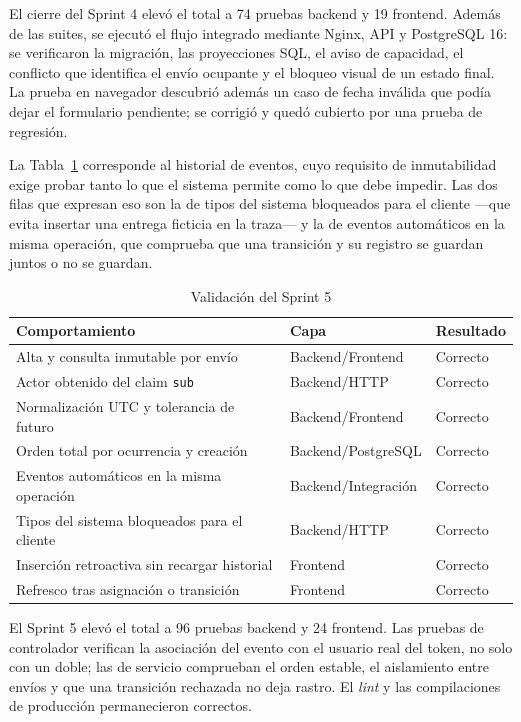 El cierre del Sprint 4 elevó el total a 74 pruebas backend y 19 frontend. Además de las suites, se ejecutó el flujo integrado mediante Nginx, API y PostgreSQL 16: se verificaron la migración, las proyecciones SQL, el aviso de capacidad, el conflicto que identifica el envío ocupante y el bloqueo visual de un estado final. La prueba en navegador descubrió además un caso de fecha inválida que podía dejar el formulario pendiente; se corrigió y quedó cubierto por una prueba de regresión.

La Tabla~\ref{tab:val-s5} corresponde al historial de eventos, cuyo requisito de inmutabilidad exige probar tanto lo que el sistema permite como lo que debe impedir. Las dos filas que expresan eso son la de tipos del sistema bloqueados para el cliente ---que evita insertar una entrega ficticia en la traza--- y la de eventos automáticos en la misma operación, que comprueba que una transición y su registro se guardan juntos o no se guardan.

\begin{table}[htbp]
\centering
\caption{Validación del Sprint 5}
\label{tab:val-s5}
\begin{tabular}{p{6.1cm}p{2.2cm}p{2.3cm}}
\hline Comportamiento & Capa & Resultado \\ \hline
Alta y consulta inmutable por envío & Backend/\allowbreak Frontend & Correcto \\
Actor obtenido del claim \texttt{sub} & Backend/\allowbreak HTTP & Correcto \\
Normalización UTC y tolerancia de futuro & Backend/\allowbreak Frontend & Correcto \\
Orden total por ocurrencia y creación & Backend/\allowbreak PostgreSQL & Correcto \\
Eventos automáticos en la misma operación & Backend/\allowbreak Integración & Correcto \\
Tipos del sistema bloqueados para el cliente & Backend/\allowbreak HTTP & Correcto \\
Inserción retroactiva sin recargar historial & Frontend & Correcto \\
Refresco tras asignación o transición & Frontend & Correcto \\
\hline
\end{tabular}
\end{table}

El Sprint 5 elevó el total a 96 pruebas backend y 24 frontend. Las pruebas de controlador verifican la asociación del evento con el usuario real del token, no solo con un doble; las de servicio comprueban el orden estable, el aislamiento entre envíos y que una transición rechazada no deja rastro. El \emph{lint} y las compilaciones de producción permanecieron correctos.

